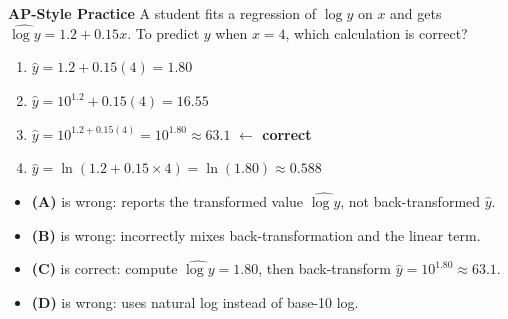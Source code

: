\documentclass[10pt]{article}
\begin{document}
\begin{tcolorbox}[colback=redbg, colframe=redacc, boxrule=0.8pt, arc=2mm,
    left=4mm, right=4mm, top=2.5mm, bottom=2.5mm]
\small\textbf{AP-Style Practice}\enspace
A student fits a regression of $\log y$ on $x$ and gets $\widehat{\log y} = 1.2 + 0.15x$.
To predict $y$ when $x = 4$, which calculation is correct?

\vspace{7pt}
\begin{enumerate}[label=\textbf{(\Alph*)}, leftmargin=2em, itemsep=4pt]
  \item $\hat{y} = 1.2 + 0.15(4) = 1.80$
  \item $\hat{y} = 10^{1.2} + 0.15(4) = 16.55$
  \item $\hat{y} = 10^{1.2 + 0.15(4)} = 10^{1.80} \approx 63.1$
        \textcolor{keyred}{\textbf{$\leftarrow$ correct}}
  \item $\hat{y} = \ln(1.2 + 0.15 \times 4) = \ln(1.80) \approx 0.588$
\end{enumerate}
\end{tcolorbox}

\vspace{0.1in}
\begin{itemize}[leftmargin=1.4em]
  \item \textbf{(A)} is wrong: reports the transformed value $\widehat{\log y}$, not
        back-transformed $\hat{y}$.
  \item \textbf{(B)} is wrong: incorrectly mixes back-transformation and the linear term.
  \item \textbf{(C)} is correct: compute $\widehat{\log y} = 1.80$, then back-transform
        $\hat{y} = 10^{1.80} \approx 63.1$.
  \item \textbf{(D)} is wrong: uses natural log instead of base-10 log.
\end{itemize}
\end{document}
